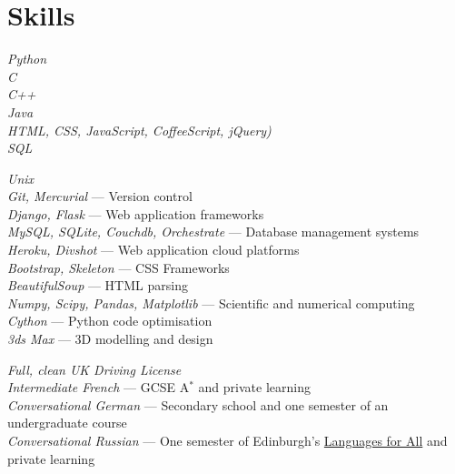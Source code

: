 \documentclass[10pt]{article}
\begin{document}


    \newpage

    \section{Skills}

        {
            \textit{Python}\\
            \textit{C}\\
            \textit{C++}\\
            \textit{Java}\\
            \textit{HTML, CSS, JavaScript, CoffeeScript, jQuery)}\\
            \textit{SQL}\\
        }

        {
            \textit{Unix}\\
            \textit{Git, Mercurial} --- Version control\\
            \textit{Django, Flask} --- Web application frameworks\\
            \textit{MySQL, SQLite, Couchdb, Orchestrate} --- Database management systems\\
            \textit{Heroku, Divshot} --- Web application cloud platforms\\
            \textit{Bootstrap, Skeleton} --- CSS Frameworks\\
            \textit{BeautifulSoup} --- HTML parsing\\
            \textit{Numpy, Scipy, Pandas, Matplotlib} --- Scientific and numerical computing\\
            \textit{Cython} --- Python code optimisation\\
            \textit{3ds Max} --- 3D modelling and design
        }


        {
            \textit{Full, clean UK Driving License}\\
            \textit{Intermediate French} --- GCSE A$^*$ and private learning\\
            \textit{Conversational German} --- Secondary school and one semester of an undergraduate course\\
            \textit{Conversational Russian} --- One semester of Edinburgh's \href{http://www.ed.ac.uk/studying/short-courses/languages/for-all}{Languages for All} and private learning
        }
\end{document}
